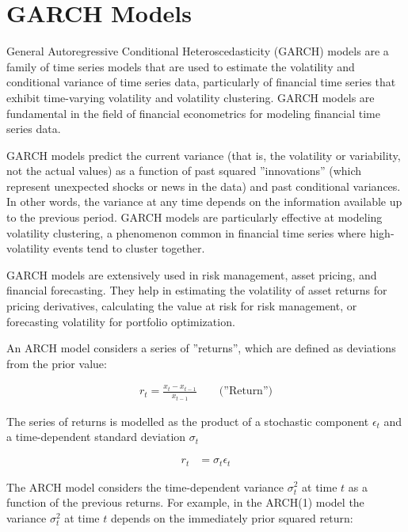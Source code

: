 \section{GARCH Models}

General Autoregressive Conditional Heteroscedasticity (GARCH) models are a family of time series models that are used to estimate the volatility and conditional variance of time series data, particularly of financial time series that exhibit time-varying volatility and volatility clustering. GARCH models are fundamental in the field of financial econometrics for modeling financial time series data.

GARCH models predict the current variance (that is, the volatility or variability, not the actual values) as a function of past squared ''innovations'' (which represent unexpected shocks or news in the data) and past conditional variances. In other words, the variance at any time depends on the information available up to the previous period. GARCH models are particularly effective at modeling volatility clustering, a phenomenon common in financial time series where high-volatility events tend to cluster together.

GARCH models are extensively used in risk management, asset pricing, and financial forecasting. They help in estimating the volatility of asset returns for pricing derivatives, calculating the value at risk for risk management, or forecasting volatility for portfolio optimization. 

An ARCH model considers a series of ''returns'', which are defined as deviations from the prior value:

\begin{align*}
r_t = \frac{x_t - x_{t-1}}{x_{t-1}} \qquad \text{(''Return'')}
\end{align*}

The series of returns is modelled as the product of a stochastic component $\epsilon_t$ and a time-dependent standard deviation $\sigma_t$

\begin{align*}
r_t &= \sigma_t \epsilon_t
\end{align*}

The ARCH model considers the time-dependent variance $\sigma_t^2$ at time $t$ as a function of the previous returns. For example, in the ARCH(1) model the variance $\sigma_t^2$ at time $t$ depends on the immediately prior squared return:

